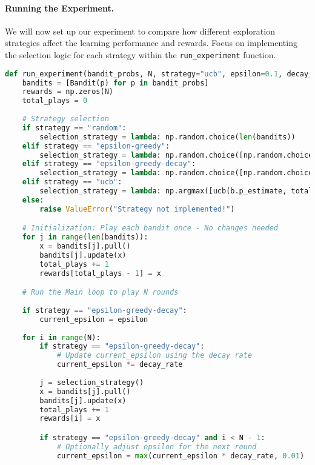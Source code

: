 \documentclass[12pt]{article}
\begin{document}
\paragraph{Running the Experiment.}
We will now set up our experiment to compare how different exploration strategies affect the learning performance and rewards. Focus on implementing the selection logic for each strategy within the \texttt{run\_experiment} function.
\begin{solution}
\begin{lstlisting}[language=Python]
def run_experiment(bandit_probs, N, strategy="ucb", epsilon=0.1, decay_rate=0.99):
    bandits = [Bandit(p) for p in bandit_probs]
    rewards = np.zeros(N)
    total_plays = 0
    
    # Strategy selection
    if strategy == "random":
        selection_strategy = lambda: np.random.choice(len(bandits))
    elif strategy == "epsilon-greedy":
        selection_strategy = lambda: np.random.choice([np.random.choice(len(bandits)), np.argmax([b.p_estimate for b in bandits])], p=[epsilon, 1-epsilon])
    elif strategy == "epsilon-greedy-decay":
        selection_strategy = lambda: np.random.choice([np.random.choice(len(bandits)), np.argmax([b.p_estimate for b in bandits])], p=[current_epsilon, 1-current_epsilon]) if np.random.random() < current_epsilon else np.argmax([b.p_estimate for b in bandits])
    elif strategy == "ucb":
        selection_strategy = lambda: np.argmax([ucb(b.p_estimate, total_plays, b.N) for b in bandits])
    else:
        raise ValueError("Strategy not implemented!")

    # Initialization: Play each bandit once - No changes needed
    for j in range(len(bandits)):
        x = bandits[j].pull()
        bandits[j].update(x)
        total_plays += 1
        rewards[total_plays - 1] = x

    # Run the Main loop to play N rounds 
    
    if strategy == "epsilon-greedy-decay":
        current_epsilon = epsilon
    
    for i in range(N):
        if strategy == "epsilon-greedy-decay":
            # Update current_epsilon using the decay rate
            current_epsilon *= decay_rate
        
        j = selection_strategy()
        x = bandits[j].pull()
        bandits[j].update(x)
        total_plays += 1
        rewards[i] = x

        if strategy == "epsilon-greedy-decay" and i < N - 1:
            # Optionally adjust epsilon for the next round
            current_epsilon = max(current_epsilon * decay_rate, 0.01)  # Ensure epsilon does not become too small


\end{lstlisting}
\end{solution}
\end{document}
